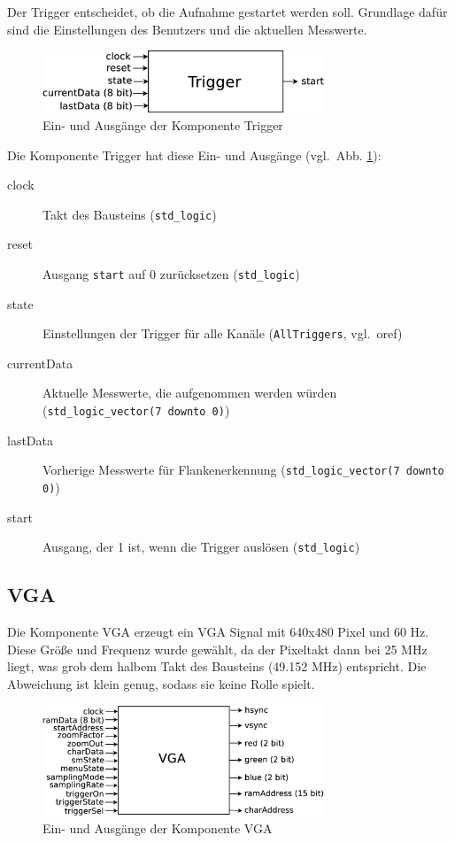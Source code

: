 \documentclass[IN,ngerman,utf8,12pt]{tumbook}
\newcommand{\vgl}{vgl.\ }
\begin{document}
Der Trigger entscheidet, ob die Aufnahme gestartet werden soll.
Grundlage dafür sind die Einstellungen des Benutzers und die aktuellen Messwerte.

\begin{figure}[H]
    \centerline{
        \includegraphics[width=0.75\textwidth]{img/trigger}
    }
    \label{abb:trigger}
    \caption{Ein- und Ausgänge der Komponente Trigger}
\end{figure}

Die Komponente Trigger hat diese Ein- und Ausgänge (\vgl Abb. \ref{abb:trigger}):

\begin{description}
    \item[clock] Takt des Bausteins (\texttt{std\_logic})
    \item[reset] Ausgang \texttt{start} auf 0 zurücksetzen (\texttt{std\_logic})
    \item[state] Einstellungen der Trigger für alle Kanäle (\texttt{AllTriggers}, \vgl o{ref})
    \item[currentData] Aktuelle Messwerte, die aufgenommen werden würden (\texttt{std\_logic\_vector(7 downto 0)})
    \item[lastData] Vorherige Messwerte für Flankenerkennung (\texttt{std\_logic\_vector(7 downto 0)})
    \item[start] Ausgang, der 1 ist, wenn die Trigger auslösen (\texttt{std\_logic})
\end{description}

\subsection{VGA}

Die Komponente VGA erzeugt ein VGA Signal mit 640x480 Pixel und 60 Hz.
Diese Größe und Frequenz wurde gewählt, da der Pixeltakt dann bei 25 MHz liegt, was grob dem halbem Takt des Bausteins (49.152 MHz) entspricht.
Die Abweichung ist klein genug, sodass sie keine Rolle spielt.

\begin{figure}[H]
    \centerline{
        \includegraphics[width=0.75\textwidth]{img/vga}
    }
    \label{abb:vga}
    \caption{Ein- und Ausgänge der Komponente VGA}
\end{figure}
\end{document}
